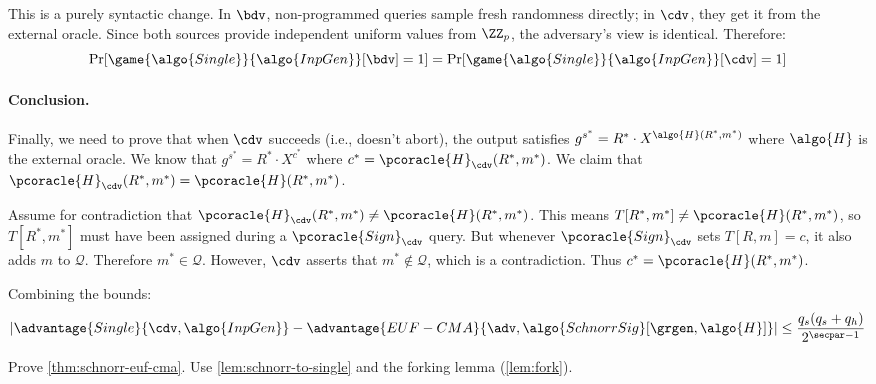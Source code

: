\begin{mysolution}
  This is a purely syntactic change. In $\bdv$, non-programmed queries sample fresh randomness directly; in $\cdv$, they get it from the external oracle.
  Since both sources provide independent uniform values from $\ZZ_p$, the adversary's view is identical. Therefore:
  \[
    \Pr[\game{\algo{Single}}{\algo{InpGen}}[\bdv] = 1] = \Pr[\game{\algo{Single}}{\algo{InpGen}}[\cdv] = 1]
  \]

  \paragraph{Conclusion.}
  Finally, we need to prove that when $\cdv$ succeeds (i.e., doesn't abort), the output satisfies $g^{s^*} = R^* \cdot X^{\algo{H}(R^*, m^*)}$ where $\algo{H}$ is the external oracle. We know that $g^{s^*} = R^* \cdot X^{c^*}$ where $c^* = \pcoracle{H}_{\cdv}(R^*, m^*)$. We claim that $\pcoracle{H}_{\cdv}(R^*, m^*) = \pcoracle{H}(R^*, m^*)$.
  
  Assume for contradiction that $\pcoracle{H}_{\cdv}(R^*, m^*) \neq \pcoracle{H}(R^*, m^*)$. This means $T[R^*, m^*] \neq \pcoracle{H}(R^*, m^*)$, so $T[R^*, m^*]$ must have been assigned during a $\pcoracle{Sign}_{\cdv}$ query. But whenever $\pcoracle{Sign}_{\cdv}$ sets $T[R, m] = c$, it also adds $m$ to $\mathcal{Q}$. Therefore $m^* \in \mathcal{Q}$. However, $\cdv$ asserts that $m^* \notin \mathcal{Q}$, which is a contradiction. Thus $c^* = \pcoracle{H}(R^*, m^*)$.
  
  Combining the bounds:
  \[
    \left|\advantage{Single}{\cdv, \algo{InpGen}} - \advantage{EUF-CMA}{\adv, \algo{SchnorrSig}[\grgen, \algo{H}]}\right| \leq \frac{q_s(q_s + q_h)}{2^{\secpar-1}}
  \]

\end{mysolution}
\fi

\begin{exercise}\label{ex:schnorr-euf-cma}
  Prove \autoref{thm:schnorr-euf-cma}. Use \autoref{lem:schnorr-to-single} and the forking lemma (\autoref{lem:fork}).
\end{exercise}

